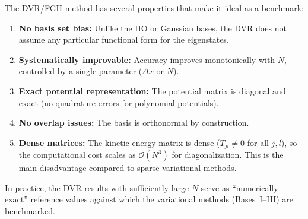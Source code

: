 The DVR/FGH method has several properties that make it ideal as a benchmark:
\begin{enumerate}
  \item \textbf{No basis set bias:} Unlike the HO or Gaussian bases, the DVR does not
        assume any particular functional form for the eigenstates.
  \item \textbf{Systematically improvable:} Accuracy improves monotonically with $N$, controlled
        by a single parameter ($\Delta x$ or $N$).
  \item \textbf{Exact potential representation:} The potential matrix is diagonal and exact
        (no quadrature errors for polynomial potentials).
  \item \textbf{No overlap issues:} The basis is orthonormal by construction.
  \item \textbf{Dense matrices:} The kinetic energy matrix is dense ($T_{jl} \neq 0$ for
        all $j, l$), so the computational cost scales as $\mathcal{O}(N^3)$ for diagonalization.
        This is the main disadvantage compared to sparse variational methods.
\end{enumerate}

In practice, the DVR results with sufficiently large $N$ serve as ``numerically exact''
reference values against which the variational methods (Bases~I--III) are benchmarked.

